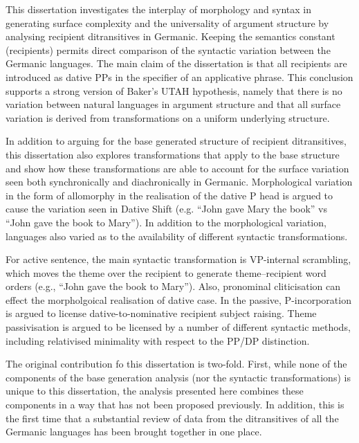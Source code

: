 This dissertation investigates the interplay of morphology and syntax in generating surface complexity and the universality of argument structure by analysing recipient ditransitives in Germanic. Keeping the semantics constant (recipients) permits direct comparison of the syntactic variation between the Germanic languages. The main claim of the dissertation is that all recipients are introduced as dative PPs in the specifier of an applicative phrase. This conclusion supports a strong version of Baker's UTAH hypothesis, namely that there is no variation between natural languages in argument structure and that all surface variation is derived from transformations on a uniform underlying structure.

In addition to arguing for the base generated structure of recipient ditransitives, this dissertation also explores transformations that apply to the base structure and show how these transformations are able to account for the surface variation seen both synchronically and diachronically in Germanic. Morphological variation in the form of allomorphy in the realisation of the dative P head is argued to cause the variation seen in Dative Shift (e.g. ``John gave Mary the book'' vs ``John gave the book to Mary''). In addition to the morphological variation, languages also varied as to the availability of different syntactic transformations.

For active sentence, the main syntactic transformation is VP-internal scrambling, which moves the theme over the recipient to generate theme--recipient word orders (e.g., ``John gave the book to Mary''). Also, pronominal cliticisation can effect the morpholgoical realisation of dative case. In the passive, P-incorporation is argued to license dative-to-nominative recipient subject raising. Theme passivisation is argued to be licensed by a number of different syntactic methods, including relativised minimality with respect to the PP/DP distinction.

The original contribution fo this dissertation is two-fold. First, while none of the components of the base generation analysis (nor the syntactic transformations) is unique to this dissertation, the analysis presented here combines these components in a way that has not been proposed previously. In addition, this is the first time that a substantial review of data from the ditransitives of all the Germanic languages has been brought together in one place.
